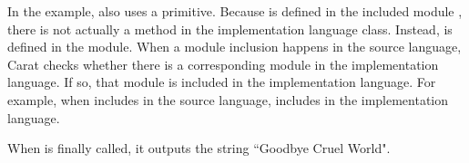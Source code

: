 In the example,  also uses a primitive. Because  is defined in the included module , there is not actually a  method in the implementation language  class. Instead,  is defined in the  module. When a module inclusion happens in the source language, Carat checks whether there is a corresponding module in the implementation language. If so, that module is included in the implementation language. For example, when  includes  in the source language,  includes  in the implementation language.

When  is finally called, it outputs the string ``Goodbye Cruel World".
